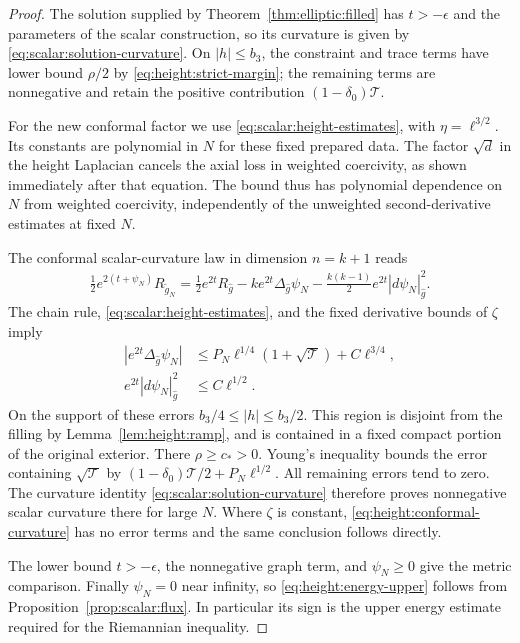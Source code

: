 \begin{proof}
The solution supplied by Theorem~\ref{thm:elliptic:filled} has
$t>-\epsilon$ and the parameters of the scalar construction, so its
curvature is given by \eqref{eq:scalar:solution-curvature}.
On $|h|\le b_3$, the constraint and trace
terms have lower bound $\rho/2$ by
\eqref{eq:height:strict-margin}; the remaining terms are
nonnegative and retain the positive contribution
$(1-\delta_0)\mathcal T$.

For the new conformal factor we use
\eqref{eq:scalar:height-estimates}, with
$\eta=\ell^{3/2}$. Its constants are polynomial in $N$ for these
fixed prepared data. The factor $\sqrt d$ in the height Laplacian
cancels the axial loss in weighted coercivity, as shown immediately
after that equation.  The bound thus has polynomial dependence on $N$
from weighted coercivity, independently of the unweighted
second-derivative estimates at fixed $N$.

The conformal scalar-curvature law in dimension $n=k+1$ reads
\begin{align}\label{eq:height:conformal-curvature}
 \tfrac12e^{2(t+\psi_N)}R_{\widetilde g_N}
 =\tfrac12e^{2t}R_{\widehat g}
 -k e^{2t}\Delta_{\widehat g}\psi_N
 -\tfrac{k(k-1)}2e^{2t}|d\psi_N|_{\widehat g}^2.
\end{align}
The chain rule, \eqref{eq:scalar:height-estimates}, and the fixed derivative bounds of
$\zeta$ imply
\begin{align*}
 |e^{2t}\Delta_{\widehat g}\psi_N|
 &\le P_N\ell^{1/4}(1+\sqrt{\mathcal T})+C\ell^{3/4},\\
 e^{2t}|d\psi_N|_{\widehat g}^2&\le C\ell^{1/2}.
\end{align*}
On the support of these errors $b_3/4\le|h|\le b_3/2$.  This region
is disjoint from the filling by Lemma~\ref{lem:height:ramp}, and is
contained in a fixed compact portion of the original exterior.  There
$\rho\ge c_*>0$.  Young's inequality bounds the error containing
$\sqrt{\mathcal T}$ by
$(1-\delta_0)\mathcal T/2+P_N\ell^{1/2}$.  All remaining errors
tend to zero.  The curvature identity \eqref{eq:scalar:solution-curvature} therefore proves
nonnegative scalar curvature there for large $N$.  Where $\zeta$ is
constant, \eqref{eq:height:conformal-curvature} has no error
terms and the same conclusion follows directly.

The lower bound $t>-\epsilon$, the nonnegative graph term, and
$\psi_N\ge0$ give the metric comparison.  Finally $\psi_N=0$ near
infinity, so \eqref{eq:height:energy-upper} follows from
Proposition~\ref{prop:scalar:flux}.  In particular its sign is the
upper energy estimate required for the Riemannian inequality.
\end{proof}

